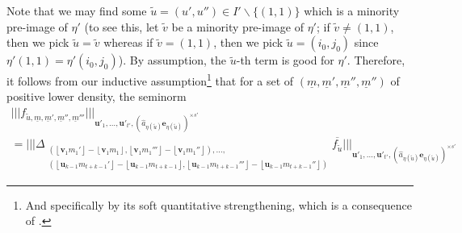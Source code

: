 \documentclass[11pt]{amsart}
\theoremstyle{definition}
\newcommand{\CG}{{\mathcal G}}
\newcommand{\be}{{\mathbf{e}}}
\newcommand{\bu}{{\mathbf{u}}}
\newcommand{\bv}{{\mathbf{v}}}
\newcommand{\um}{{\underline{m}}}
\newcommand{\nnorm}[1]{\lvert\!|\!| #1|\!|\!\rvert}
\newcommand{\Bignnorm}[1]{\Big|\!\Big|\!\Big| #1\Big|\!\Big|\!\Big|}
\newcommand{\1}{{\mathbf{1}}}
\newcommand{\floor}[1]{{\left \lfloor #1 \right \rfloor}}
\begin{document}
     
      Note that we may find some $\tilde{u}=(u',u'')\in I'\backslash\{(1,1)\}$ which is a minority pre-image of $\eta'$ (to see this, let $\tilde{v}$ be a minority pre-image of $\eta'$; if $\tilde{v}\neq (1,1)$, then we pick $\tilde{u}=\tilde{v}$ whereas if $\tilde{v}=(1,1)$, then we pick $\tilde{u}=(i_{0},j_{0})$ since   $\eta'(1,1)=\eta'(i_{0},j_{0})$). By assumption,
      the $\tilde{u}$-th term is good for $\eta'$.
           Therefore, it follows %
           from our inductive assumption\footnote{And specifically by its soft quantitative strengthening, which is a consequence of \cite[Proposition~A.2]{FrKu22a}.}
           that for a set of $(\um,\um',\um'',\um'')$ of positive lower density, the seminorm
\begin{multline*}
    \nnorm{f_{\tilde{u},\um,\um',\um'',\um'''}}_{\bu'_{1},\dots,\bu'_{t'},(\hat{a}_{\eta(\tilde{u})}\be_{\eta(\tilde{u})})^{\times s'}}
   \\=\Bignnorm{\Delta_{\substack{(\floor{\bv_1 m_1'} - \floor{\bv_1 m_1}, \floor{\bv_1 m_1'''} - \floor{\bv_1 m_1''}), \ldots,\\ (\floor{\bu_{k-1} m_{t+k-1}'} - \floor{\bu_{k-1} m_{t+k-1}}, \floor{\bu_{k-1} m_{t+k-1}'''} - \floor{\bu_{k-1} m_{t+k-1}''})}}\overline{f_{\tilde{u}}}}_{\bu'_{1},\dots,\bu'_{t'},(\hat{a}_{\eta(\tilde{u})}\be_{\eta(\tilde{u})})^{\times s'}}
\end{multline*}
\end{document}
